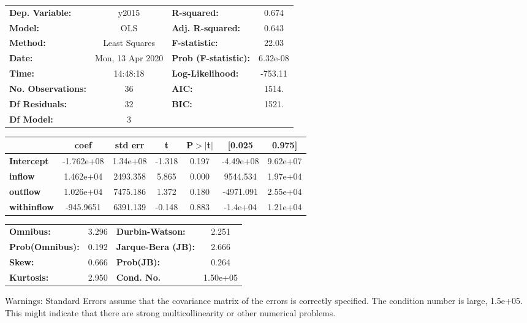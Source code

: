 \begin{center}
\begin{tabular}{lclc}
\toprule
\textbf{Dep. Variable:}    &      y2015       & \textbf{  R-squared:         } &     0.674   \\
\textbf{Model:}            &       OLS        & \textbf{  Adj. R-squared:    } &     0.643   \\
\textbf{Method:}           &  Least Squares   & \textbf{  F-statistic:       } &     22.03   \\
\textbf{Date:}             & Mon, 13 Apr 2020 & \textbf{  Prob (F-statistic):} &  6.32e-08   \\
\textbf{Time:}             &     14:48:18     & \textbf{  Log-Likelihood:    } &   -753.11   \\
\textbf{No. Observations:} &          36      & \textbf{  AIC:               } &     1514.   \\
\textbf{Df Residuals:}     &          32      & \textbf{  BIC:               } &     1521.   \\
\textbf{Df Model:}         &           3      & \textbf{                     } &             \\
\bottomrule
\end{tabular}
\begin{tabular}{lcccccc}
                    & \textbf{coef} & \textbf{std err} & \textbf{t} & \textbf{P$> |$t$|$} & \textbf{[0.025} & \textbf{0.975]}  \\
\midrule
\textbf{Intercept}  &   -1.762e+08  &     1.34e+08     &    -1.318  &         0.197        &    -4.49e+08    &     9.62e+07     \\
\textbf{inflow}     &    1.462e+04  &     2493.358     &     5.865  &         0.000        &     9544.534    &     1.97e+04     \\
\textbf{outflow}    &    1.026e+04  &     7475.186     &     1.372  &         0.180        &    -4971.091    &     2.55e+04     \\
\textbf{withinflow} &    -945.9651  &     6391.139     &    -0.148  &         0.883        &     -1.4e+04    &     1.21e+04     \\
\bottomrule
\end{tabular}
\begin{tabular}{lclc}
\textbf{Omnibus:}       &  3.296 & \textbf{  Durbin-Watson:     } &    2.251  \\
\textbf{Prob(Omnibus):} &  0.192 & \textbf{  Jarque-Bera (JB):  } &    2.666  \\
\textbf{Skew:}          &  0.666 & \textbf{  Prob(JB):          } &    0.264  \\
\textbf{Kurtosis:}      &  2.950 & \textbf{  Cond. No.          } & 1.50e+05  \\
\bottomrule
\end{tabular}
\end{center}

Warnings: \newline
 [1] Standard Errors assume that the covariance matrix of the errors is correctly specified. \newline
 [2] The condition number is large, 1.5e+05. This might indicate that there are \newline
 strong multicollinearity or other numerical problems.